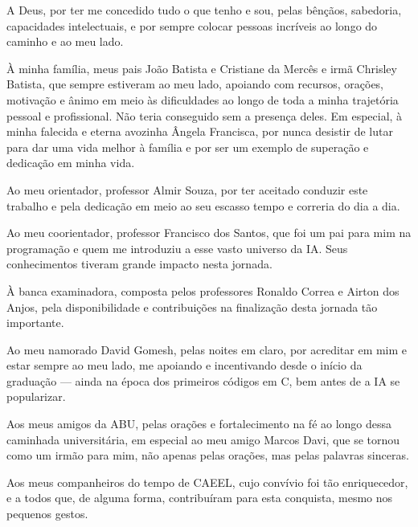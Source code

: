 \begin{agradecimentos}

A Deus, por ter me concedido tudo o que tenho e sou, pelas bênçãos, sabedoria, capacidades intelectuais, e por sempre colocar pessoas incríveis ao longo do caminho e ao meu lado.

À minha família, meus pais João Batista e Cristiane da Mercês e irmã Chrisley Batista, que sempre estiveram ao meu lado, apoiando com recursos, orações, motivação e ânimo em meio às dificuldades ao longo de toda a minha trajetória pessoal e profissional. Não teria conseguido sem a presença deles. Em especial, à minha falecida e eterna avozinha Ângela Francisca, por nunca desistir de lutar para dar uma vida melhor à família e por ser um exemplo de superação e dedicação em minha vida.

Ao meu orientador, professor Almir Souza, por ter aceitado conduzir este trabalho e pela dedicação em meio ao seu escasso tempo e correria do dia a dia.

Ao meu coorientador, professor Francisco dos Santos, que foi um pai para mim na programação e quem me introduziu a esse vasto universo da IA. Seus conhecimentos tiveram grande impacto nesta jornada.

À banca examinadora, composta pelos professores Ronaldo Correa e Airton dos Anjos, pela disponibilidade e contribuições na finalização desta jornada tão importante.

Ao meu namorado David Gomesh, pelas noites em claro, por acreditar em mim e estar sempre ao meu lado, me apoiando e incentivando desde o início da graduação — ainda na época dos primeiros códigos em C, bem antes de a IA se popularizar.

Aos meus amigos da ABU, pelas orações e fortalecimento na fé ao longo dessa caminhada universitária, em especial ao meu amigo Marcos Davi, que se tornou como um irmão para mim, não apenas pelas orações, mas pelas palavras sinceras.

Aos meus companheiros do tempo de CAEEL, cujo convívio foi tão enriquecedor, e a todos que, de alguma forma, contribuíram para esta conquista, mesmo nos pequenos gestos.

\end{agradecimentos}
